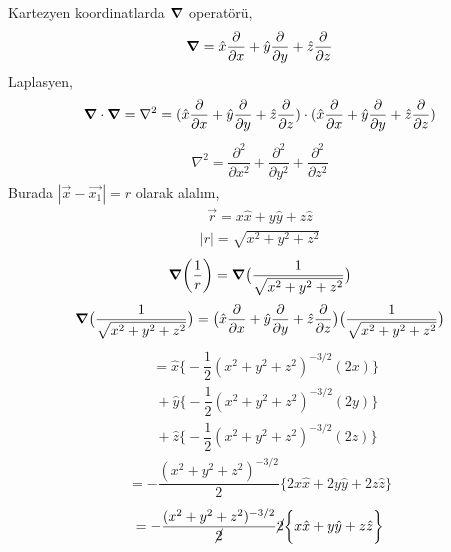 \noindent Kartezyen koordinatlarda $\grad$ operatörü,
\begin{align}
    \grad = \hat{x} \dfrac{\partial}{\partial x} + \hat{y} \dfrac{\partial}{\partial y} + \hat{z} \dfrac{\partial}{\partial z}
\end{align}
Laplasyen,
\begin{align}
  \grad \cdot \grad  =  \nabla^{2} = (  \hat{x} \dfrac{\partial}{\partial x} + \hat{y} \dfrac{\partial}{\partial y} + \hat{z} \dfrac{\partial}{\partial z} ) \cdot (  \hat{x} \dfrac{\partial}{\partial x} + \hat{y} \dfrac{\partial}{\partial y} + \hat{z} \dfrac{\partial}{\partial z} )
\end{align}
\begin{align}
    \nabla^{2} =  \dfrac{\partial^{2}}{\partial x^{2}} + \dfrac{\partial^{2}}{\partial y^{2}} + \dfrac{\partial^{2}}{\partial z^{2}} 
\end{align}
Burada $|\Vec{x} - \Vec{x_{1}}| = r $ olarak alalım,
\begin{align}
    \Vec{r} = x \hat{x} + y \hat{y} + z \hat{z}
\end{align}
\begin{align}
|r| = \sqrt{x^{2} + y^{2}  + z^{2} }
\end{align}
\begin{align}
  \grad(\dfrac{1}{r}) = \grad \big( \dfrac{1}{\sqrt{x^{2} + y^{2} + z^{2}}}  \big) 
\end{align}
\begin{align}
 \grad \big( \dfrac{1}{\sqrt{x^{2} + y^{2} + z^{2}}}  \big) = \big(  \hat{x} \dfrac{\partial}{\partial x} + \hat{y} \dfrac{\partial}{\partial y} + \hat{z} \dfrac{\partial}{\partial z} \big) \big( \dfrac{1}{\sqrt{x^{2} + y^{2} + z^{2}}}  \big)
\end{align}
\begin{align}
&= \hat{x}  \bigg\{ - \dfrac{1}{2} (x^{2} + y^{2} + z^{2})^{-3/2} (2x) \bigg\} \\
&\ + \hat{y} \bigg\{ - \dfrac{1}{2} (x^{2} + y^{2} + z^{2})^{-3/2} (2y) \bigg\} \\
&\ + \hat{z} \bigg\{ - \dfrac{1}{2} (x^{2} + y^{2} + z^{2})^{-3/2} (2z) \bigg\} 
\end{align}
\begin{align}
    = - \dfrac{(x^{2} + y^{2} + z^{2})^{-3/2}}{2}  \bigg\{ 2x \hat{x} + 2y \hat{y} + 2z \hat{z} \bigg\} 
\end{align}
\begin{align}
    = - \dfrac{(x^{2} + y^{2} + z^{2})^{-3/2}}{\cancel{2}} \cancel{2} \bigg\{ x \hat{x} + y \hat{y} + z \hat{z} \bigg\} 
\end{align}

